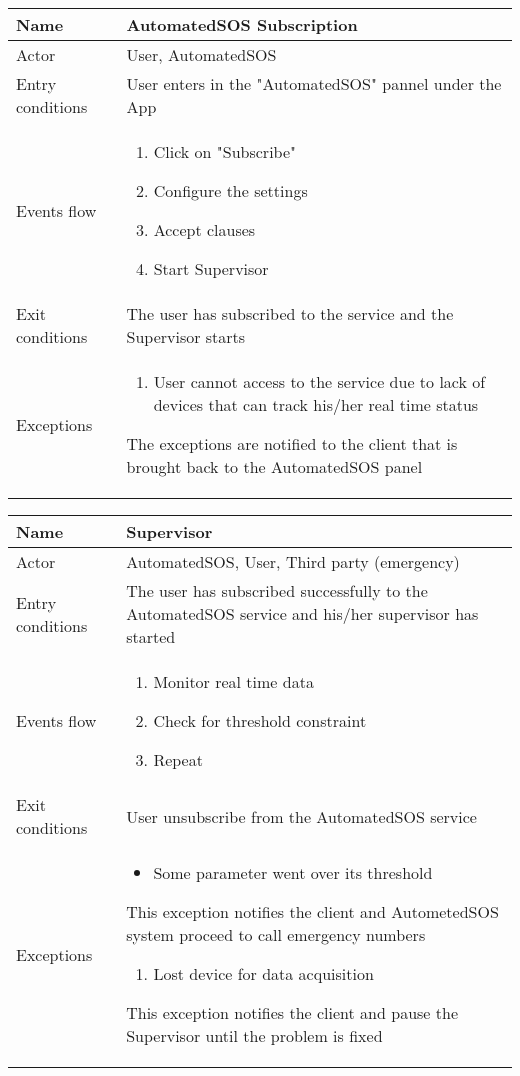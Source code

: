 \begin{table}[]
\begin{tabular}{|l|l|}
\hline
Name             & AutomatedSOS Subscription \\ \hline
Actor            & User, AutomatedSOS \\ \hline
Entry conditions & User enters in the "AutomatedSOS" pannel under the App \\ \hline
Events flow      & \begin{enumerate}
\item Click on "Subscribe"
\item Configure the settings
\item Accept clauses
\item Start Supervisor
\end{enumerate} \\ \hline
Exit conditions  & The user has subscribed to the service and the Supervisor starts \\ \hline
Exceptions       & \begin{enumerate}
\item User cannot access to the service due to lack of devices that can track his/her real time status
\end{enumerate} The exceptions are notified to the client that is brought back to the AutomatedSOS panel\\ \hline
\end{tabular}
\end{table}

\begin{table}[]
\begin{tabular}{|l|l|}
\hline
Name             & Supervisor \\ \hline
Actor            & AutomatedSOS, User, Third party (emergency) \\ \hline
Entry conditions & The user has subscribed successfully to the AutomatedSOS service and his/her supervisor has started \\ \hline
Events flow      & \begin{enumerate}
\item Monitor real time data
\item Check for threshold constraint
\item Repeat
\end{enumerate} \\ \hline
Exit conditions  & User unsubscribe from the AutomatedSOS service \\ \hline
Exceptions       & \begin{itemize}
\item Some parameter went over its threshold
\end{itemize} This exception notifies the client and AutometedSOS system proceed to call emergency numbers \begin{enumerate}
\item Lost device for data acquisition
\end{enumerate} This exception notifies the client and pause the Supervisor until the problem is fixed \\ \hline
\end{tabular}
\end{table}

